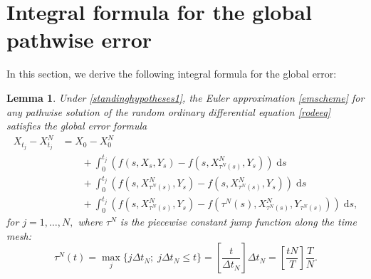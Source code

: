 \documentclass[reqno,12pt]{amsart}
\theoremstyle{plain}%
\newtheorem{lem}{Lemma}[section]
\theoremstyle{definition}
\begin{document}
\section{Integral formula for the global pathwise error}

In this section, we derive the following integral formula for the global error:
\begin{lem}
    \label{lemglobalerrorintegralformula}
    Under \cref{standinghypotheses1}, the Euler approximation \eqref{emscheme} for any pathwise solution of the random ordinary differential equation \eqref{rodeeq} satisfies the global error formula
    \begin{equation}
        \label{globalerrorintegralformula}
        \begin{aligned}
            X_{t_j} - X_{t_j}^N & = X_0 - X_0^N \\
            & \qquad + \int_0^{t_j} \left( f(s, X_s, Y_s) - f(s, X_{\tau^N(s)}^N, Y_s) \right)\;\mathrm{d}s  \\ 
            & \qquad + \int_{0}^{t_j} \left( f(s, X_{\tau^N(s)}^N, Y_s) - f(s, X_{\tau^N(s)}^N, Y_s) \right)\;\mathrm{d}s \\
            & \qquad + \int_0^{t_j} \left( f(s, X_{\tau^N(s)}^N, Y_s) - f(\tau^N(s), X_{\tau^N(s)}^N, Y_{\tau^N(s)}) \right)\;\mathrm{d}s,
        \end{aligned}
    \end{equation}
    for $j = 1, \ldots, N,$ where $\tau^N$ is the piecewise constant jump function along the time mesh:
    \begin{equation}
        \label{tauNt}
        \tau^N(t) = \max_j\{j\Delta t_N; \; j\Delta t_N \leq t\} = \left[\frac{t}{\Delta t_N}\right]\Delta t_N = \left[\frac{tN}{T}\right]\frac{T}{N}.
    \end{equation}
\end{lem}
\end{document}
